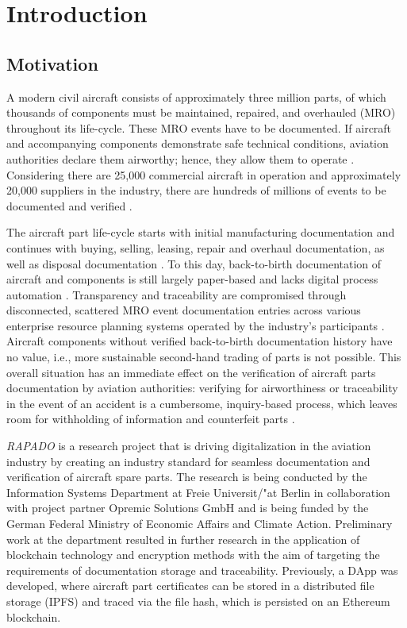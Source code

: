 \chapter{Introduction}
\citet{kliewer2005optimierung}
\citet{semesterproject}
\section{Motivation}
A modern civil aircraft consists of approximately three million parts, of which thousands of components must be maintained, repaired, and overhauled (MRO) throughout its life-cycle. These MRO events have to be documented. If aircraft and accompanying components demonstrate safe technical conditions, aviation authorities declare them airworthy; hence, they allow them to operate \citep{FornaconFrank}. Considering there are 25,000 commercial aircraft in operation and approximately 20,000 suppliers in the industry, there are hundreds of millions of events to be documented and verified \citep{mroBCservices1}.

The aircraft part life-cycle starts with initial manufacturing documentation and continues with buying, selling, leasing, repair and overhaul documentation, as well as disposal documentation \citep{FornaconFrank, mroBCservices}. To this day, back-to-birth documentation of aircraft and components is still largely paper-based and lacks digital process automation \citep{efthymiou}. Transparency and traceability are compromised through disconnected, scattered MRO event documentation entries across various enterprise resource planning systems operated by the industry's participants \citep{FornaconFrank, mroBCservices1}. Aircraft components without verified back-to-birth documentation history have no value, i.e., more sustainable second-hand trading of parts is not possible. This overall situation has an immediate effect on the verification of aircraft parts documentation by aviation authorities: verifying for airworthiness or traceability in the event of an accident is a cumbersome, inquiry-based process, which leaves room for withholding of information and counterfeit parts \citep{planecrash, efthymiou}.

\textit{RAPADO} is a research project that is driving digitalization in the aviation industry by creating an industry standard for seamless documentation and verification of aircraft spare parts. The research is being conducted by the Information Systems Department at Freie Universit{/"a}t Berlin in collaboration with project partner Opremic Solutions GmbH and is being funded by the German Federal Ministry of Economic Affairs and Climate Action. Preliminary work at the department resulted in further research in the application of blockchain technology and encryption methods with the aim of targeting the requirements of documentation storage and traceability. Previously, a DApp was developed, where aircraft part certificates can be stored in a distributed file storage (IPFS) and traced via the file hash, which is persisted on an Ethereum blockchain.

